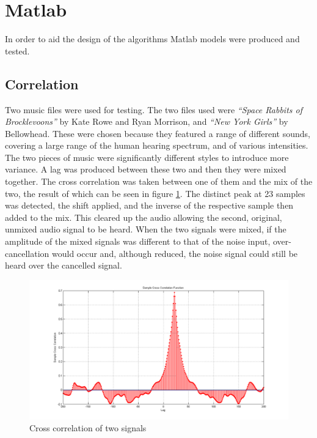 \section{Matlab}
In order to aid the design of the algorithms Matlab models were produced and
tested.

\subsection{Correlation}

Two music files were used for testing.
The two files used were \emph{``Space Rabbits of Brocklevoons''} by Kate Rowe and Ryan Morrison, and \emph{``New York Girls''} by Bellowhead.
These were chosen because they featured a range of different sounds, covering a large range of the human hearing spectrum, and of various intensities.
The two pieces of music were significantly different styles to introduce more variance.
A lag was produced between these two and then they were mixed together.
The cross correlation was taken between one of them and the mix of the two, the result of which can be seen in figure \ref{fig:modelcrosscorr}.
The distinct peak at 23 samples was detected, the shift applied, and the inverse of the respective sample then added to the mix.
This cleared up the audio allowing the second, original, unmixed audio signal to be heard.
When the two signals were mixed, if the amplitude of the mixed signals was different to that of the noise input, over-cancellation would occur and, although reduced, the noise signal could still be heard over the cancelled signal.

\begin{figure}[H]
	\centering
	\includegraphics[width=\textwidth]{./img/crosscorr.png}
	\caption{Cross correlation of two signals}
	\label{fig:modelcrosscorr}
\end{figure}

